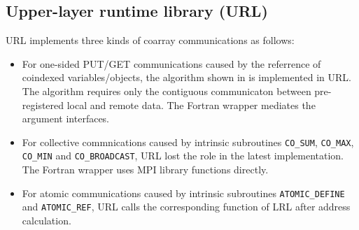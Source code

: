 

\subsection{Upper-layer runtime library (URL)}

URL implements three kinds of coarray communications as follows:
\begin{itemize}
\item
For one-sided PUT/GET communications caused by the referrence of coindexed
variables/objects, the algorithm shown in  is implemented in URL. 
The algorithm requires only the contiguous communicaton between 
pre-registered local and remote data.
The Fortran wrapper mediates the argument interfaces.

\item 
For collective commnications caused by intrinsic subroutines 
{\tt CO\_SUM}, {\tt CO\_MAX}, {\tt CO\_MIN} and {\tt CO\_BROADCAST}, 
URL lost the role in the latest implementation. 
The Fortran wrapper uses MPI library functions directly.

\item
For atomic communications caused by intrinsic subroutines
{\tt ATOMIC\_DEFINE} and {\tt ATOMIC\_REF}, 
URL calls the corresponding function of LRL after address calculation.
\end{itemize}



